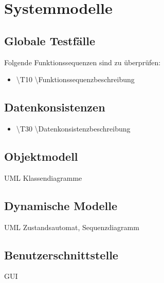\section{Systemmodelle}

\subsection{Globale Testfälle}
Folgende Funktionssequenzen sind zu überprüfen:

\begin{itemize}
\item \textbackslash T10 \textbackslash Funktionssequenzbeschreibung
\end{itemize}

\subsection{Datenkonsistenzen}

\begin{itemize}
\item \textbackslash T30 \textbackslash Datenkonsistenzbeschreibung
\end{itemize}

\subsection{Objektmodell}

UML Klassendiagramme

\subsection{Dynamische Modelle}
 UML Zustandsautomat, Sequenzdiagramm

\subsection{Benutzerschnittstelle}

GUI